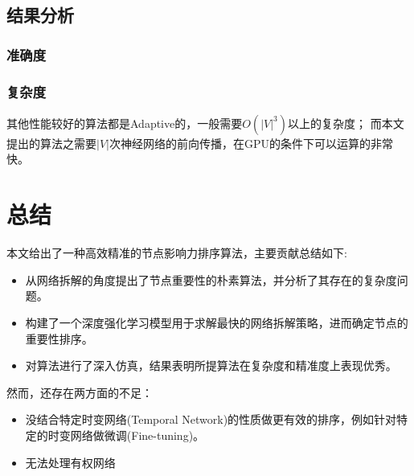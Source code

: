 \documentclass[twocolumn]{morningstar}
\begin{document}
\subsection{结果分析}\label{sec:ResultAnalysis}


\subsubsection{准确度}\label{sec:Accuracy}




\subsubsection{复杂度}\label{sec:Complexity}


其他性能较好的算法都是Adaptive的，一般需要$O(|V|^3)$以上的复杂度；
而本文提出的算法之需要$|V|$次神经网络的前向传播，在GPU的条件下可以运算的非常快。





\section{总结}\label{sec:Conclusion}

本文给出了一种高效精准的节点影响力排序算法，主要贡献总结如下:

\begin{itemize}
    \item 从网络拆解的角度提出了节点重要性的朴素算法，并分析了其存在的复杂度问题。
    \item 构建了一个深度强化学习模型用于求解最快的网络拆解策略，进而确定节点的重要性排序。
    \item 对算法进行了深入仿真，结果表明所提算法在复杂度和精准度上表现优秀。
\end{itemize}

然而，还存在两方面的不足：

\begin{itemize}
    \item 没结合特定时变网络(Temporal Network)的性质做更有效的排序，例如针对特定的时变网络做微调(Fine-tuning)。
    \item 无法处理有权网络
\end{itemize}


\end{document}
